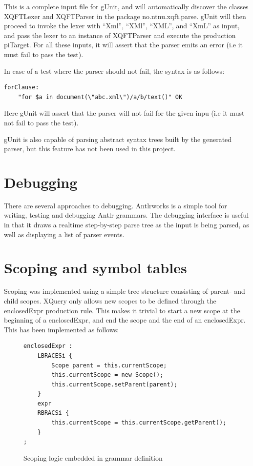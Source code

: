 This is a complete input file for gUnit, and will automatically discover the
classes XQFTLexer and XQFTParser in the package no.ntnu.xqft.parse. gUnit will
then proceed to invoke the lexer with ``Xml'', ``XMl'', ``XML'', and ``XmL'' as
input, and pass the lexer to an instance of XQFTParser and execute the production
piTarget. For all these inputs, it will assert that the parser emits an error
(i.e it must fail to pass the test).

In case of a test where the parser should not fail, the syntax is as follows:
\begin{verbatim}
forClause:
	"for $a in document(\"abc.xml\")/a/b/text()" OK
\end{verbatim}
Here gUnit will assert that the parser will not fail for the given inpu (i.e it
must not fail to pass the test).

gUnit is also capable of parsing abstract syntax trees built by the generated
parser, but this feature has not been used in this project.

\section{Debugging}
There are several approaches to debugging. Antlrworks \cite{antlrwrks00} is a
simple tool for writing, testing and debugging Antlr grammars. The debugging
interface is useful in that it draws a realtime step-by-step parse tree as the
input is being parsed, as well as displaying a list of parser events.

\section{Scoping and symbol tables}
Scoping was implemented using a simple tree structure consisting of parent- and
child scopes. XQuery only allows new scopes to be defined through the
enclosedExpr production rule. This makes it trivial to start a new scope at the
beginning of a enclosedExpr, and end the scope and the end of an enclosedExpr.
This has been implemented as follows:
\begin{figure}[!h]
\begin{verbatim}
enclosedExpr : 
    LBRACESi {
        Scope parent = this.currentScope; 
        this.currentScope = new Scope(); 
        this.currentScope.setParent(parent); 
    }
    expr 
    RBRACSi { 
        this.currentScope = this.currentScope.getParent(); 
    }
;
\end{verbatim}
\caption{Scoping logic embedded in grammar definition}
\end{figure}

